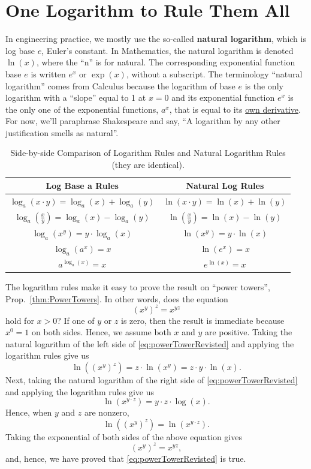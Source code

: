\section{One Logarithm to Rule Them All}

In engineering practice, we mostly use the so-called \textbf{natural logarithm}, which is log base $e$, Euler's constant. In Mathematics, the natural logarithm is denoted $\ln(x)$, where the ``n'' is for natural. The corresponding exponential function base $e$ is written $e^x$ or $\exp(x)$, without a subscript. The terminology ``natural logarithm'' comes from Calculus because the logarithm of base $e$ is the only logarithm with a ``slope'' equal to 1 at $x=0$ and its exponential function $e^x$ is the only one of the exponential functions, $a^x$, that is equal to its \href{https://www.youtube.com/shorts/w8w8XtfJVvg}{own derivative}. For now, we'll paraphrase Shakespeare and say, ``A logarithm by any other justification smells as natural''. 

\begin{table}[htb]
\centering
\begin{tabular}{|c|c|}
\hline
\textbf{Log Base a Rules} & \textbf{Natural Log Rules} \\ \hline \hline
$\log_a(x \cdot y) = \log_a(x) + \log_a(y)$ & $\ln(x \cdot y) = \ln(x) + \ln(y)$ \\ \hline
$\log_a\left(\frac{x}{y}\right) = \log_a(x) - \log_a(y)$ & $\ln\left(\frac{x}{y}\right) = \ln(x) - \ln(y)$ \\ \hline
$\log_a(x^y) = y  \cdot\log_a(x)$ & $\ln(x^y) = y  \cdot \ln(x)$ \\ \hline
$\log_a(a^x) = x$ & $\ln(e^x) = x$ \\ \hline
$a^{\log_a(x)} = x$ & $e^{\ln(x)} = x$ \\ \hline
\end{tabular}
\caption{Side-by-side Comparison of Logarithm Rules and Natural Logarithm Rules (they are identical).}
\label{table:logrules}
\end{table}

The logarithm rules make it easy to prove the result on ``power towers'', Prop.~\ref{thm:PowerTowers}. In other words, does the equation
\begin{equation}
\label{eq:powerTowerRevisted}
    (x^y)^z = x^{y z}
\end{equation}
hold for $x>0$? If one of $y$ or $z$ is zero, then the result is immediate because $x^0=1$ on both sides. Hence, we assume both $x$ and $y$ are positive. Taking the natural logarithm of the left side of \eqref{eq:powerTowerRevisted} and applying the logarithm rules give us
$$
\ln((x^y)^z) = z \cdot\ln(x^{y}) = z \cdot y \cdot \ln(x).
$$
Next, taking the natural logarithm of the right side of \eqref{eq:powerTowerRevisted} and applying the logarithm rules give us
$$
\ln(x^{y \cdot z})= y \cdot z \cdot \log(x).
$$
Hence, when $y$ and $z$ are nonzero, 
$$\ln((x^y)^z) = \ln(x^{y \cdot z}).$$
Taking the exponential of both sides of the above equation gives
$$
(x^y)^z = x^{y z},
$$
and, hence, we have proved that \eqref{eq:powerTowerRevisted} is true. \Qed

